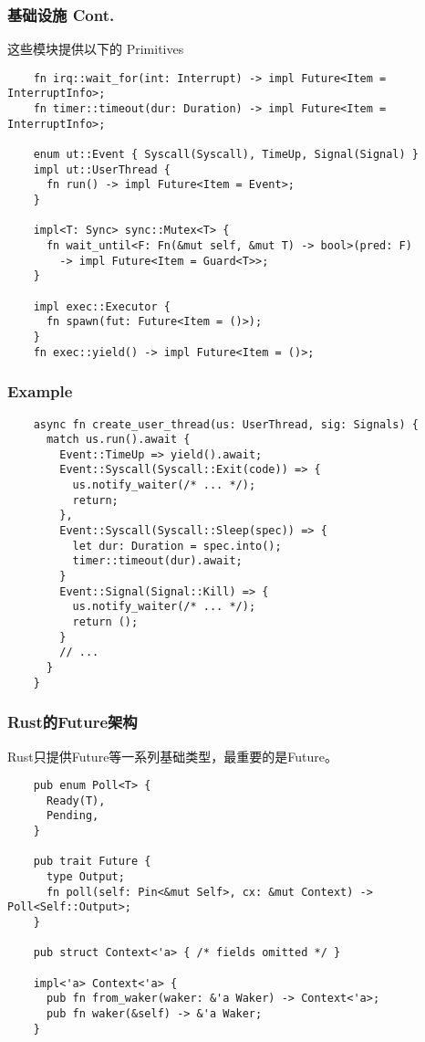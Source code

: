 \documentclass[UTF-8]{ctexbeamer}
\begin{document}
\begin{frame}[fragile]
  \frametitle{基础设施 Cont.}

  这些模块提供以下的 Primitives
  \vspace{1em}

  {
    \scriptsize
    \begin{verbatim}
    fn irq::wait_for(int: Interrupt) -> impl Future<Item = InterruptInfo>;
    fn timer::timeout(dur: Duration) -> impl Future<Item = InterruptInfo>;

    enum ut::Event { Syscall(Syscall), TimeUp, Signal(Signal) }
    impl ut::UserThread {
      fn run() -> impl Future<Item = Event>;
    }

    impl<T: Sync> sync::Mutex<T> {
      fn wait_until<F: Fn(&mut self, &mut T) -> bool>(pred: F)
        -> impl Future<Item = Guard<T>>;
    }

    impl exec::Executor {
      fn spawn(fut: Future<Item = ()>);
    }
    fn exec::yield() -> impl Future<Item = ()>;
  \end{verbatim}
  }
\end{frame}

\begin{frame}[fragile]
  \frametitle{Example}

  \scriptsize
  \begin{verbatim}
    async fn create_user_thread(us: UserThread, sig: Signals) {
      match us.run().await {
        Event::TimeUp => yield().await;
        Event::Syscall(Syscall::Exit(code)) => {
          us.notify_waiter(/* ... */);
          return;
        },
        Event::Syscall(Syscall::Sleep(spec)) => {
          let dur: Duration = spec.into();
          timer::timeout(dur).await;
        }
        Event::Signal(Signal::Kill) => {
          us.notify_waiter(/* ... */);
          return ();
        }
        // ...
      }
    }
  \end{verbatim}
\end{frame}

\begin{frame}[fragile]
  \frametitle{Rust的Future架构}

  Rust只提供Future等一系列基础类型，最重要的是Future。
  {
  \scriptsize
  \begin{verbatim}
    pub enum Poll<T> {
      Ready(T),
      Pending,
    }

    pub trait Future {
      type Output;
      fn poll(self: Pin<&mut Self>, cx: &mut Context) -> Poll<Self::Output>;
    }

    pub struct Context<'a> { /* fields omitted */ }

    impl<'a> Context<'a> {
      pub fn from_waker(waker: &'a Waker) -> Context<'a>;
      pub fn waker(&self) -> &'a Waker;
    }
  \end{verbatim}
  }
\end{frame}
\end{document}
